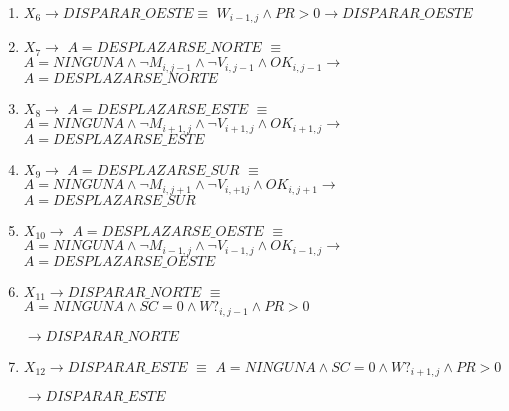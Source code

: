 \begin{enumerate}
    \item   $X_6 \longrightarrow DISPARAR\_OESTE \equiv$
    \newline
    $W_{i-1, j} \land PR > 0 \longrightarrow DISPARAR\_OESTE$

    \item   $ X_7                 \longrightarrow$
    $A = DESPLAZARSE\_NORTE $
    $\equiv$
    \newline
    $ A = NINGUNA \land \neg M_{i, j-1} \land \neg V_{i, j-1} \land OK_{i, j-1} \longrightarrow$
    \newline
    $A = DESPLAZARSE\_NORTE$
            
    \item  $ X_8                 \longrightarrow$
    $A = DESPLAZARSE\_ESTE $
    $\equiv$
    \newline
    $ A = NINGUNA \land \neg M_{i+1, j} \land \neg V_{i+1, j} \land OK_{i+1, j} \longrightarrow$
    \newline
    $A = DESPLAZARSE\_ESTE $
                    
    \item  $ X_9                 \longrightarrow$
    $A = DESPLAZARSE\_SUR $
    $\equiv$
    \newline
    $ A = NINGUNA \land \neg M_{i, j+1} \land \neg V_{i, +1j} \land OK_{i, j+1} \longrightarrow$
    \newline
    $A = DESPLAZARSE\_SUR $
            
    \item  $ X_{10}                 \longrightarrow$
    $A = DESPLAZARSE\_OESTE $
    $\equiv$
    \newline
    $ A = NINGUNA \land \neg M_{i-1, j} \land \neg V_{i-1, j} \land OK_{i-1, j} \longrightarrow$
    \newline
    $A = DESPLAZARSE\_OESTE $

    \item $X_{11} \longrightarrow DISPARAR\_NORTE$
    $\equiv$
    \newline
    $A = NINGUNA \land SC = 0 \land W?_{i, j-1} \land PR > 0$ 
            
    $\longrightarrow DISPARAR\_NORTE$
            
    \item $X_{12} \longrightarrow DISPARAR\_ESTE$
    $\equiv$
    \newline
    $A = NINGUNA \land SC = 0 \land W?_{i+1, j} \land PR > 0$ 
            
    $\longrightarrow DISPARAR\_ESTE$
            

\end{enumerate}
